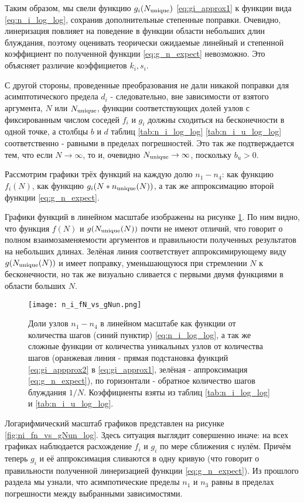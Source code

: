 Таким образом, мы свели функцию $g_i(N_{\textup{unique}})$ \eqref{eq:gi_approx1} к функции вида \eqref{eq:n_i_log_log}, сохранив дополнительные степенные поправки. 
Очевидно, линеризация повлияет на поведение в функции области небольших длин блуждания, поэтому оценивать теорически ожидаемые линейный и степенной коэффициент по полученной функции \eqref{eq:g_n_expect} невозможно.
Это объясняет различие коэффициетов $k_i, s_i$. 

С другой стороны, проведенные преобразования не дали никакой поправки для асимптотического предела $d_i$ - следовательно, вне зависимости от взятого аргумента, $N$ или $N_{\textup{unique}}$, функции соответствующих долей узлов с фиксированным числом соседей $f_i$ и $g_i$ должны сходиться на бесконечности в одной точке, а столбцы $b$ и $d$ таблиц \ref{tab:n_i_log_log} \ref{tab:n_i_u_log_log} соответственно - равными в пределах погрешностей.
Это так же подтверждается тем, что если $N \to \infty$, то и, очевидно $N_{\textup{unique}} \to \infty$, поскольку $b_u > 0$.  

Рассмотрим графики трёх функций на каждую долю $n_1 - n_4$: как функцию $f_i(N)$, как функцию $g_i(N*n_{\textup{unique}}(N))$, а так же аппроксимацию второй функции \eqref{eq:g_n_expect}.

Графики функций в линейном масштабе изображены на рисунке \ref{fig:ni_fn_vs_gNun}. По ним видно, что функция $f(N)$ и $g(N_{\textup{unique}}(N))$ почти не имеют отличий, что говорит о полном взаимозаменяемости аргументов и правильности полученных результатов на небольших длинах. Зелёная линия соответствует аппроксимирующему виду $g(N_{\textup{unique}}(N))$ и имеет поправку, уменьшающуюся при стремлении $N$ к бесконечности, но так же визуально сливается с первыми двумя функциями в области больших $N$.

\begin{figure}
\centering
\texttt{[image: n\_i\_fN\_vs\_gNun.png]}
\label{fig:ni_fn_vs_gNun}
\caption{Доли узлов $n_1-n_4$ в линейном масштабе как функции от количества шагов (синий пунктир) \eqref{eq:n_i_log_log}, а так же сложные функции от количества уникальных узлов от количества шагов (оранжевая линия - прямая подстановка функций  \eqref{eq:gi_appprox2} в \eqref{eq:gi_approx1}, зелёная - аппроксимация \eqref{eq:g_n_expect}), по горизонтали - обратное количество шагов блуждания $1/N$. Коэффициенты взяты из таблиц \ref{tab:n_i_log_log} и \ref{tab:n_i_u_log_log}.}
\end{figure}

Логарифмический масштаб графиков представлен на рисунке \ref{fig:ni_fn_vs_gNun_log}. 
Здесь ситуация выглядит совершенно иначе: на всех графиках наблюдается расхождение $f_i$ и $g_i$ по мере сближения с нулём.
Причём теперь $g_i$ и её аппроксимация сливаются в одну кривую (что говорит о правильности полученной линеризацией функции \eqref{eq:g_n_expect}). 
Из прошлого раздела мы узнали, что асимпотические пределы $n_1$ и $n_3$ равны в пределах погрешности между выбранными зависимостями.


